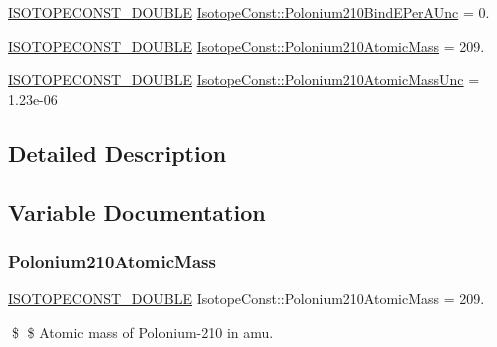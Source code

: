 \begin{DoxyCompactItemize}
\mbox{\hyperlink{group___isotope_const-_macros_ga8f45a7272ce02c0b4c65c44636ed719a}{I\+S\+O\+T\+O\+P\+E\+C\+O\+N\+S\+T\+\_\+\+D\+O\+U\+B\+LE}} \mbox{\hyperlink{group___isotope_const-_polonium-_po210_gabf1c5d3cb0a88a01b0fbdc24c28ee769}{Isotope\+Const\+::\+Polonium210\+Bind\+E\+Per\+A\+Unc}} = 0.
\item 
\mbox{\hyperlink{group___isotope_const-_macros_ga8f45a7272ce02c0b4c65c44636ed719a}{I\+S\+O\+T\+O\+P\+E\+C\+O\+N\+S\+T\+\_\+\+D\+O\+U\+B\+LE}} \mbox{\hyperlink{group___isotope_const-_polonium-_po210_gab123fd05ab62adf8a1fef92ea440a8b7}{Isotope\+Const\+::\+Polonium210\+Atomic\+Mass}} = 209.
\item 
\mbox{\hyperlink{group___isotope_const-_macros_ga8f45a7272ce02c0b4c65c44636ed719a}{I\+S\+O\+T\+O\+P\+E\+C\+O\+N\+S\+T\+\_\+\+D\+O\+U\+B\+LE}} \mbox{\hyperlink{group___isotope_const-_polonium-_po210_ga4efc2d6d935c350e1c488a8167ad3e85}{Isotope\+Const\+::\+Polonium210\+Atomic\+Mass\+Unc}} = 1.\+23e-\/06
\end{DoxyCompactItemize}


\subsection{Detailed Description}


\subsection{Variable Documentation}
\mbox{\label{group___isotope_const-_polonium-_po210_gab123fd05ab62adf8a1fef92ea440a8b7}} 
\subsubsection{\texorpdfstring{Polonium210\+Atomic\+Mass}{Polonium210AtomicMass}}
{\footnotesize\ttfamily \mbox{\hyperlink{group___isotope_const-_macros_ga8f45a7272ce02c0b4c65c44636ed719a}{I\+S\+O\+T\+O\+P\+E\+C\+O\+N\+S\+T\+\_\+\+D\+O\+U\+B\+LE}} Isotope\+Const\+::\+Polonium210\+Atomic\+Mass = 209.}

\$ \$ Atomic mass of Polonium-\/210 in amu. \mbox{\label{group___isotope_const-_polonium-_po210_ga4efc2d6d935c350e1c488a8167ad3e85}} 
